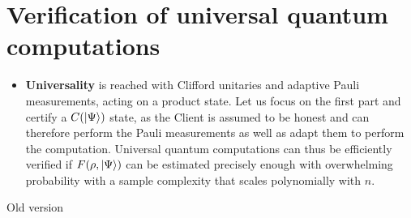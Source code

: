 \documentclass[a4paper,unpublished,onecolumn,11pt]{quantumarticle}
\begin{document}
\section{Verification of universal quantum computations}
\begin{itemize}
    \item \textbf{Universality} is reached with Clifford unitaries and adaptive Pauli measurements, acting on a product state. Let us focus on the first part and certify a $C(\ket\Psi)$ state, as the Client is assumed to be honest and can therefore perform the Pauli measurements as well as adapt them to perform the computation. Universal quantum computations can thus be efficiently verified if $F(\rho, \ket\Psi)$ can be estimated precisely enough with overwhelming probability with a sample complexity that scales polynomially with $n$.
\end{itemize}

\newpage
Old version
\end{document}
